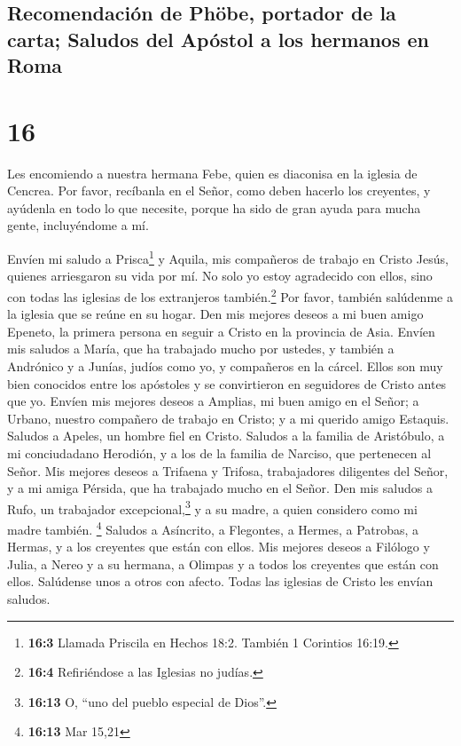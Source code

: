 \hypertarget{recomendaciuxf3n-de-phuxf6be-portador-de-la-carta-saludos-del-apuxf3stol-a-los-hermanos-en-roma}{%
\subsection{Recomendación de Phöbe, portador de la carta; Saludos del
Apóstol a los hermanos en
Roma}\label{recomendaciuxf3n-de-phuxf6be-portador-de-la-carta-saludos-del-apuxf3stol-a-los-hermanos-en-roma}}

\hypertarget{section-15}{%
\section{16}\label{section-15}}

 Les encomiendo a nuestra hermana Febe, quien es diaconisa
en la iglesia de Cencrea.  Por favor, recíbanla en el
Señor, como deben hacerlo los creyentes, y ayúdenla en todo lo que
necesite, porque ha sido de gran ayuda para mucha gente, incluyéndome a
mí.

 Envíen mi saludo a Prisca\footnote{\textbf{16:3} Llamada
  Priscila en Hechos 18:2. También 1 Corintios 16:19.} y Aquila, mis
compañeros de trabajo en Cristo Jesús,  quienes
arriesgaron su vida por mí. No solo yo estoy agradecido con ellos, sino
con todas las iglesias de los extranjeros también.\footnote{\textbf{16:4}
  Refiriéndose a las Iglesias no judías.}  Por favor,
también salúdenme a la iglesia que se reúne en su hogar. Den mis mejores
deseos a mi buen amigo Epeneto, la primera persona en seguir a Cristo en
la provincia de Asia.  Envíen mis saludos a María, que ha
trabajado mucho por ustedes,  y también a Andrónico y a
Junías, judíos como yo, y compañeros en la cárcel. Ellos son muy bien
conocidos entre los apóstoles y se convirtieron en seguidores de Cristo
antes que yo.  Envíen mis mejores deseos a Amplias, mi
buen amigo en el Señor;  a Urbano, nuestro compañero de
trabajo en Cristo; y a mi querido amigo Estaquis. 
Saludos a Apeles, un hombre fiel en Cristo. Saludos a la familia de
Aristóbulo,  a mi conciudadano Herodión, y a los de la
familia de Narciso, que pertenecen al Señor.  Mis mejores
deseos a Trifaena y Trifosa, trabajadores diligentes del Señor, y a mi
amiga Pérsida, que ha trabajado mucho en el Señor.  Den
mis saludos a Rufo, un trabajador excepcional,\footnote{\textbf{16:13}
  O, ``uno del pueblo especial de Dios''.} y a su madre, a quien
considero como mi madre también. \footnote{\textbf{16:13} Mar 15,21}
 Saludos a Asíncrito, a Flegontes, a Hermes, a Patrobas,
a Hermas, y a los creyentes que están con ellos.  Mis
mejores deseos a Filólogo y Julia, a Nereo y a su hermana, a Olimpas y a
todos los creyentes que están con ellos.  Salúdense unos
a otros con afecto. Todas las iglesias de Cristo les envían saludos.

